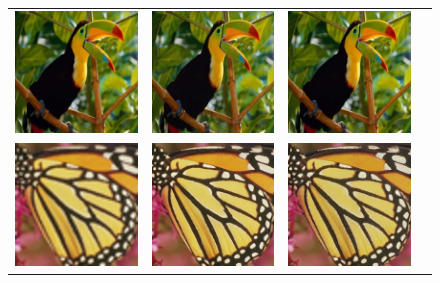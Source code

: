 \documentclass[10pt,twocolumn,letterpaper]{article}
\begin{document}
\begin{figure}[h!]
\begin{tabular}{cccc}
\includegraphics[width=1.4in]{images/used/appendix/jpg/Set5/bird_SRResNet-MSE} &
\includegraphics[width=1.4in]{images/used/appendix/jpg/Set5/bird_SRGAN-VGG54} &
\includegraphics[width=1.4in]{images/used/appendix/jpg/Set5/bird_HR} \\
\includegraphics[width=1.4in]{images/used/appendix/jpg/Set5/butterfly_bicubic}&
\includegraphics[width=1.4in]{images/used/appendix/jpg/Set5/butterfly_SRResNet-MSE} &
\includegraphics[width=1.4in]{images/used/appendix/jpg/Set5/butterfly_SRGAN-VGG54} &

\end{tabular}
\end{figure}
\end{document}

